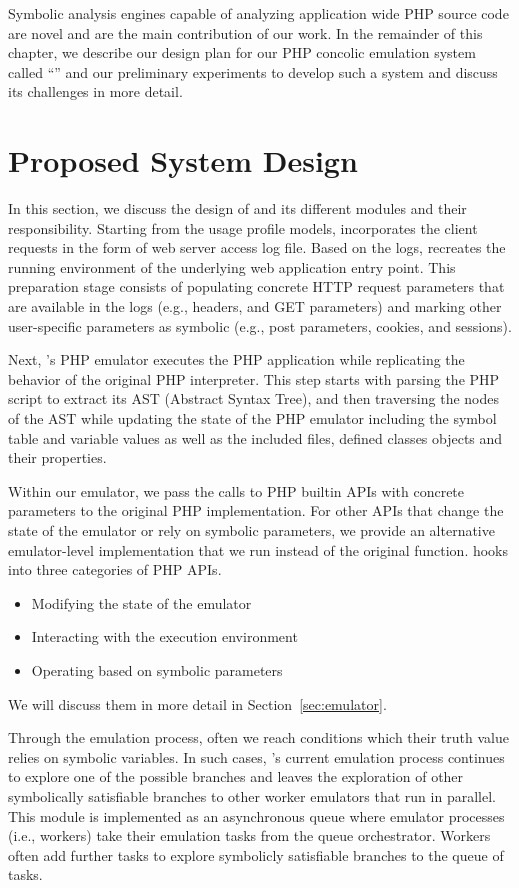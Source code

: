 Symbolic analysis engines capable of analyzing application wide PHP source code are novel and are the main contribution of our work. 
In the remainder of this chapter, we describe our design plan for our PHP concolic emulation system called ``\animatedead{}'' and our preliminary experiments to develop such a system and discuss its challenges in more detail. 

\section{Proposed System Design}
In this section, we discuss the design of \animatedead{} and its different modules and their responsibility. 
Starting from the usage profile models, \animatedead{} incorporates the client requests in the form of web server access log file. 
Based on the logs, \animatedead{} recreates the running environment of the underlying web application entry point. 
This preparation stage consists of populating concrete HTTP request parameters that are available in the logs (e.g., headers, and GET parameters) and marking other user-specific parameters as symbolic (e.g., post parameters, cookies, and sessions). 

Next, \animatedead{}'s PHP emulator executes the PHP application while replicating the behavior of the original PHP interpreter. 
This step starts with parsing the PHP script to extract its AST (Abstract Syntax Tree), and then traversing the nodes of the AST while updating the state of the PHP emulator including the symbol table and variable values as well as the included files, defined classes objects and their properties. 

Within our emulator, we pass the calls to PHP builtin APIs with concrete parameters to the original PHP implementation. 
For other APIs that change the state of the emulator or rely on symbolic parameters, we provide an alternative emulator-level implementation that we run instead of the original function. 
\animatedead{} hooks into three categories of PHP APIs. 
\begin{itemize}
    \item Modifying the state of the emulator
    \item Interacting with the execution environment
    \item Operating based on symbolic parameters
\end{itemize}
We will discuss them in more detail in Section~\ref{sec:emulator}.

Through the emulation process, often we reach conditions which their truth value relies on symbolic variables. 
In such cases, \animatedead{}'s current emulation process continues to explore one of the possible branches and leaves the exploration of other symbolically satisfiable branches to other worker emulators that run in parallel. 
This module is implemented as an asynchronous queue where emulator processes (i.e., workers) take their emulation tasks from the queue orchestrator. 
Workers often add further tasks to explore symbolicly satisfiable branches to the queue of tasks. 

